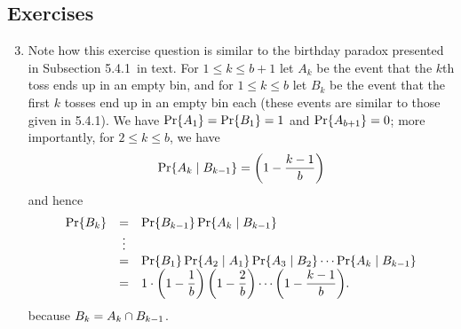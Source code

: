 \subsection*{Exercises}
\begin{enumerate}[\thesection-1]
\setcounter{enumi}{2}
%
\item Note how this exercise question is similar to the birthday paradox presented in Subsection 5.4.1~in text. For $1 \leq k \leq b + 1$ let $A_k$ be the event that the $k$th toss ends up in an empty bin, and for $1 \leq k \leq b$ let $B_k$ be the event that the first $k$ tosses end up in an empty bin each (these events are similar to those given in 5.4.1). We have $\Pr\!\left\{A_1\right\} = \Pr\!\left\{B_1\right\} = 1$ and $\Pr\!\left\{A_{b + 1}\right\} = 0$; more importantly, for $2 \leq k \leq b$, we have
\[
\Pr\!\left\{A_k \mid B_{k - 1}\right\} = \left(1 - \frac{k - 1}{b}\right)
\]
and hence
\[
\begin{array}{lcl}
\Pr\!\left\{B_k\right\} & = & \Pr\!\left\{B_{k - 1}\right\} \Pr\!\left\{A_k \mid B_{k - 1}\right\} \cr
         & \vdots & \cr
         & = & \Pr\!\left\{B_1\right\} \Pr\!\left\{A_2 \mid A_1\right\} \Pr\!\left\{A_3 \mid B_2\right\} \cdots \Pr\!\left\{A_k \mid B_{k - 1}\right\} \cr
         & = & {\displaystyle1 \cdot \left(1 - \frac{1}{b}\right) \left(1 - \frac{2}{b}\right) \cdots \left(1 - \frac{k - 1}{b}\right)}. \cr
\end{array}
\]
because $B_k = A_k \cap B_{k - 1}$.


\end{enumerate}
